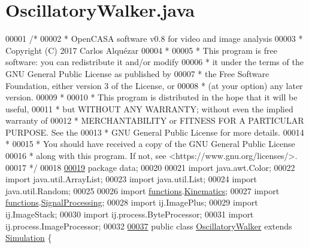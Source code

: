 \hypertarget{_oscillatory_walker_8java_source}{}\section{Oscillatory\+Walker.\+java}
\label{_oscillatory_walker_8java_source}

\begin{DoxyCode}
00001 \textcolor{comment}{/*}
00002 \textcolor{comment}{ *   OpenCASA software v0.8 for video and image analysis}
00003 \textcolor{comment}{ *   Copyright (C) 2017  Carlos Alquézar}
00004 \textcolor{comment}{ *}
00005 \textcolor{comment}{ *   This program is free software: you can redistribute it and/or modify}
00006 \textcolor{comment}{ *   it under the terms of the GNU General Public License as published by}
00007 \textcolor{comment}{ *   the Free Software Foundation, either version 3 of the License, or}
00008 \textcolor{comment}{ *   (at your option) any later version.}
00009 \textcolor{comment}{ *}
00010 \textcolor{comment}{ *   This program is distributed in the hope that it will be useful,}
00011 \textcolor{comment}{ *   but WITHOUT ANY WARRANTY; without even the implied warranty of}
00012 \textcolor{comment}{ *   MERCHANTABILITY or FITNESS FOR A PARTICULAR PURPOSE.  See the}
00013 \textcolor{comment}{ *   GNU General Public License for more details.}
00014 \textcolor{comment}{ *}
00015 \textcolor{comment}{ *   You should have received a copy of the GNU General Public License}
00016 \textcolor{comment}{ *   along with this program.  If not, see <https://www.gnu.org/licenses/>.}
00017 \textcolor{comment}{*/}    
00018 
\hypertarget{_oscillatory_walker_8java_source_l00019}{}\hyperlink{namespacedata}{00019} \textcolor{keyword}{package }data;
00020 
00021 \textcolor{keyword}{import} java.awt.Color;
00022 \textcolor{keyword}{import} java.util.ArrayList;
00023 \textcolor{keyword}{import} java.util.List;
00024 \textcolor{keyword}{import} java.util.Random;
00025 
00026 \textcolor{keyword}{import} \hyperlink{namespacefunctions}{functions}.\hyperlink{classfunctions_1_1_kinematics}{Kinematics};
00027 \textcolor{keyword}{import} \hyperlink{namespacefunctions}{functions}.\hyperlink{classfunctions_1_1_signal_processing}{SignalProcessing};
00028 \textcolor{keyword}{import} ij.ImagePlus;
00029 \textcolor{keyword}{import} ij.ImageStack;
00030 \textcolor{keyword}{import} ij.process.ByteProcessor;
00031 \textcolor{keyword}{import} ij.process.ImageProcessor;
00032 
\hypertarget{_oscillatory_walker_8java_source_l00037}{}\hyperlink{classdata_1_1_oscillatory_walker}{00037} \textcolor{keyword}{public} \textcolor{keyword}{class }\hyperlink{classdata_1_1_oscillatory_walker}{OscillatoryWalker} \textcolor{keyword}{extends} \hyperlink{classdata_1_1_simulation}{Simulation} \{

\end{DoxyCode}
